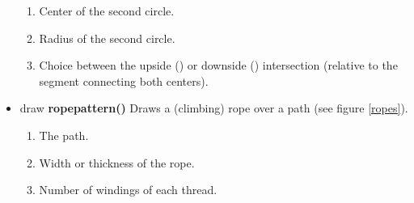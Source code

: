 \begin{itemize}
\begin{enumerate}
  \item {} Center of the second circle.
  \item {} Radius of the second circle.
  \item {} Choice between the upside () or
    downside () intersection (relative to the segment
    connecting both centers). 
  \end{enumerate}
\item draw {\bfseries ropepattern()} Draws a (climbing) rope over a
  path (see figure \ref{ropes}).
  \begin{enumerate}
  \item {} The path.
  \item {} Width or thickness of the rope.
  \item {} Number of windings of each thread.
  \end{enumerate}
  

\end{itemize}
